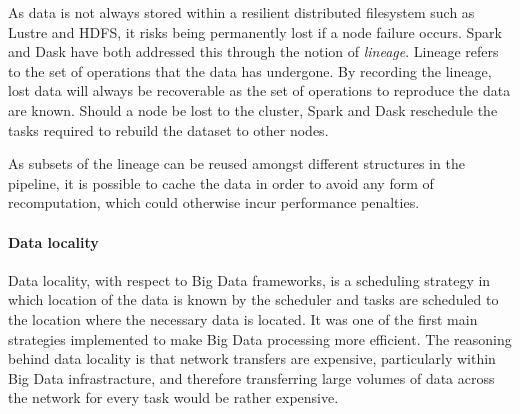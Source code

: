                     As data is not always stored within a resilient distributed 
                    filesystem such as Lustre and HDFS, it risks being 
                    permanently lost if a node failure occurs. Spark and Dask
                    have both addressed this through the notion of 
                    \textit{lineage}. Lineage refers to the set of operations
                    that the data has undergone. By recording the lineage, lost
                    data will always be recoverable as the set of operations
                    to reproduce the data are known. Should a node be lost to 
                    the cluster, Spark and Dask reschedule the tasks required 
                    to rebuild the dataset to other nodes.

                    As subsets of the lineage can be reused amongst different
                    structures in the pipeline, it is possible to cache the 
                    data in order to avoid any form of recomputation, which 
                    could otherwise incur performance penalties.
                                      
 
                \paragraph{Data locality}
                    Data locality, with respect to Big Data frameworks, is a
                    scheduling
                    strategy in which location of the data is known by the 
                    scheduler and tasks are scheduled to the location where the
                    necessary data is located. It was one of the first main 
                    strategies implemented to make Big Data processing more 
                    efficient. The reasoning behind data locality is that 
                    network transfers are expensive, particularly within 
                    Big Data infrastracture, and therefore transferring large 
                    volumes of data across the network for every task would be 
                    rather expensive.

